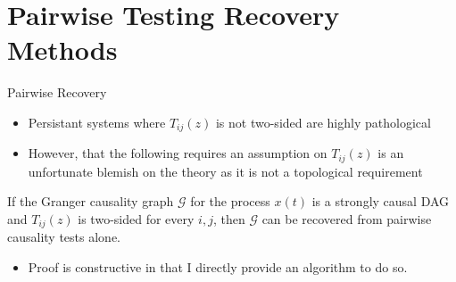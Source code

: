 \documentclass{beamer} %
\def\gcg{\mathcal{G}}  %
\begin{document}
\section{Pairwise Testing Recovery Methods}
\begin{frame}{Pairwise Recovery}
  \begin{itemize}
    \item{Persistant systems where $T_{ij}(z)$ is not two-sided are highly pathological}\pause
    \item{However, that the following requires an assumption on
        $T_{ij}(z)$ is an unfortunate blemish on the theory as it is
        not a topological requirement}\pause
  \end{itemize}

    \begin{theorem}
      \label{thm:scg_recovery}
      If the Granger causality graph $\gcg$ for the process $x(t)$ is
      a strongly causal DAG and $T_{ij}(z)$ is two-sided for every
      $i, j$, then $\gcg$ can be recovered from pairwise causality
      tests alone.
    \end{theorem}

    \begin{itemize}
      \item{Proof is constructive in that I directly provide an algorithm to do so.}
    \end{itemize}
\end{frame}
\end{document}
